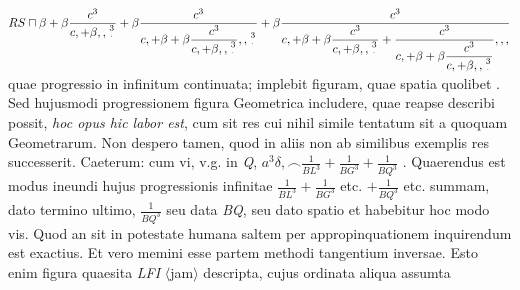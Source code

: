                      {} $\displaystyle RS \sqcap \beta + \beta\frac{c^3}{c, + \beta,,\genfrac{}{}{0pt}{}{3}{^\cdotp}}+\beta\frac{c^3}{c,+\beta+\beta\displaystyle\frac{c^3}{c,+\beta,,\genfrac{}{}{0pt}{}{3}{^\cdotp}},,\genfrac{}{}{0pt}{1}{3}{^\cdotp}}+\beta\frac{c^3}{c,+\beta+\beta\displaystyle\frac{c^3}{c,+\beta,,\genfrac{}{}{0pt}{}{3}{^\cdotp}}+\displaystyle\frac{c^3}{c,+\beta+\beta\displaystyle\frac{c^3}{c,+\beta,,\genfrac{}{}{0pt}{}{3}{^\cdotp}}},,,}$ quae progressio in infinitum continuata; implebit figuram, quae spatia quolibet . Sed hujusmodi progressionem figura Geometrica includere, quae reapse describi possit, \textit{hoc opus hic labor est}, cum sit res cui nihil simile tentatum sit a quoquam Geometrarum. Non despero tamen, quod in aliis non ab similibus exemplis res successerit. Caeterum: cum vi, v.g. in \textit{Q}, $\displaystyle a^3\delta,\smallfrown\frac{1}{BL^3}+\frac{1}{BG^3}+\frac{1}{BQ^3}$ . Quaerendus est modus ineundi hujus progressionis infinitae $\displaystyle \frac{1}{BL^3}+\frac{1}{BG^3}$ etc. $+ \displaystyle\frac{1}{BQ^3}$ etc. summam, dato termino ultimo, $\displaystyle \frac{1}{BQ^3}$ seu data \textit{BQ}, seu dato spatio et habebitur hoc modo vis. Quod an sit in potestate humana saltem per appropinquationem inquirendum est exactius. Et vero memini esse partem methodi tangentium inversae. Esto enim figura quaesita \textit{LFI} $\langle$jam$\rangle$ descripta, cujus ordinata aliqua assumta 
